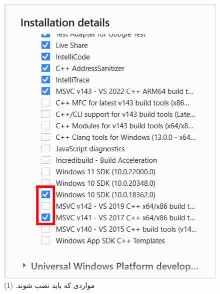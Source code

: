 {\begin{spacing}{1.5}
\begin{figure}[H]
            \includegraphics[scale=0.6]{Images/3/3.Intro.3.2}
            \caption*{مواردی که باید نصب شوند. (1)}
        \end{figure}


\end{spacing}}
